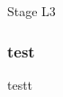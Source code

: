 \documentclass{beamer}
\title{\letitle}
\author{\leauthor}
\institute{}
\date{}
\begin{document}
\maketitle
\begin{frame}
Stage L3
\end{frame}
\begin{frame}
\frametitle{ test}


testt
\end{frame}
\end{document}
